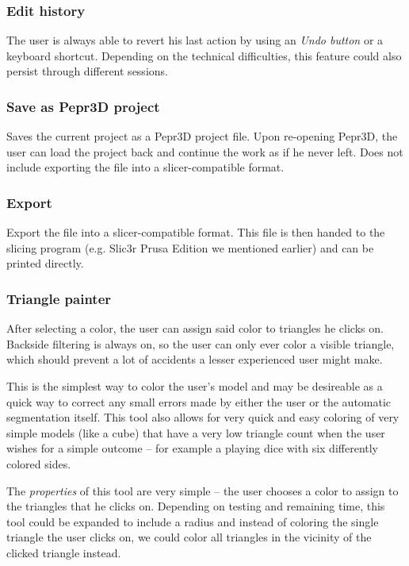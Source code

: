 \subsubsection{Edit history}
The user is always able to revert his last action by using an \textit{Undo button} or a keyboard shortcut. Depending on the technical difficulties, this feature could also persist through different sessions.

\subsubsection{Save as Pepr3D project}
Saves the current project as a Pepr3D project file. Upon re-opening Pepr3D, the user can load the project back and continue the work as if he never left. Does not include exporting the file into a slicer-compatible format.

\subsubsection{Export}
Export the file into a slicer-compatible format. This file is then handed to the slicing program (e.g. Slic3r Prusa Edition we mentioned earlier) and can be printed directly.

\subsubsection{Triangle painter}
After selecting a color, the user can assign said color to triangles he clicks on. Backside filtering is always on, so the user can only ever color a visible triangle, which should prevent a lot of accidents a lesser experienced user might make.

This is the simplest way to color the user's model and may be desireable as a quick way to correct any small errors made by either the user or the automatic segmentation itself. This tool also allows for very quick and easy coloring of very simple models (like a cube) that have a very low triangle count when the user wishes for a simple outcome -- for example a playing dice with six differently colored sides.

The \textit{properties} of this tool are very simple -- the user chooses a color to assign to the triangles that he clicks on. Depending on testing and remaining time, this tool could be expanded to include a radius and instead of coloring the single triangle the user clicks on, we could color all triangles in the vicinity of the clicked triangle instead.

